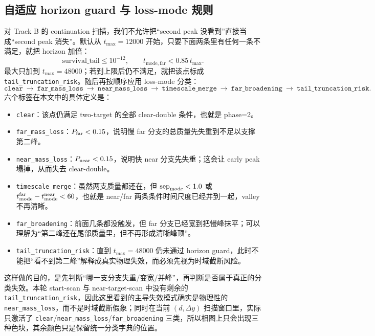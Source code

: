 \documentclass[11pt,fontset=fandol]{ctexart}
\begin{document}
\subsection*{自适应 horizon guard 与 loss-mode 规则}
对 Track B 的 continuation 扫描，我们不允许把“second peak 没看到”直接当成“second peak 消失”。默认从 $t_{\max}=12000$ 开始，只要下面两条里有任何一条不满足，就把 horizon 加倍：
\[
\mathrm{survival\_tail}\le 10^{-12},
\qquad
t_{\mathrm{mode,far}} < 0.85\, t_{\max}.
\]
最大只加到 $t_{\max}=48000$；若到上限后仍不满足，就把该点标成 \texttt{tail\_truncation\_risk}。随后再按顺序应用 loss-mode 分类：
\[
\texttt{clear}\ \rightarrow\ \texttt{far\_mass\_loss}\ \rightarrow\ \texttt{near\_mass\_loss}\ \rightarrow\ \texttt{timescale\_merge}\ \rightarrow\ \texttt{far\_broadening}\ \rightarrow\ \texttt{tail\_truncation\_risk}.
\]
六个标签在本文中的具体定义是：
\begin{itemize}
  \item \texttt{clear}：该点仍满足 two-target 的全部 clear-double 条件，也就是 phase=2。
  \item \texttt{far\_mass\_loss}：$P_{\rm far}<0.15$，说明慢 far 分支的总质量先失重到不足以支撑第二峰。
  \item \texttt{near\_mass\_loss}：$P_{\rm near}<0.15$，说明快 near 分支先失重；这会让 early peak 塌掉，从而失去 clear-double。
  \item \texttt{timescale\_merge}：虽然两支质量都还在，但 $\mathrm{sep}_{\rm mode}<1.0$ 或 $t_{\rm mode}^{\rm far}-t_{\rm mode}^{\rm near}<60$，也就是 near/far 两条条件时间尺度已经并到一起，valley 不再清晰。
  \item \texttt{far\_broadening}：前面几条都没触发，但 far 分支已经宽到把慢峰抹平；可以理解为“第二峰还在尾部质量里，但不再形成清晰峰顶”。
  \item \texttt{tail\_truncation\_risk}：直到 $t_{\max}=48000$ 仍未通过 horizon guard，此时不能把“看不到第二峰”解释成真实物理失效，而必须先视为时域截断风险。
\end{itemize}
这样做的目的，是先判断“哪一支分支失重/变宽/并峰”，再判断是否属于真正的分类失效。本轮 start-scan 与 near-target-scan 中没有剩余的 \texttt{tail\_truncation\_risk}，因此这里看到的主导失效模式确实是物理性的 \texttt{near\_mass\_loss}，而不是时域截断假象；同时在当前 $(d,\Delta y)$ 扫描窗口里，实际只激活了 \texttt{clear}/\texttt{near\_mass\_loss}/\texttt{far\_broadening} 三类，所以相图上只会出现三种色块，其余颜色只是保留统一分类字典的位置。
\end{document}
